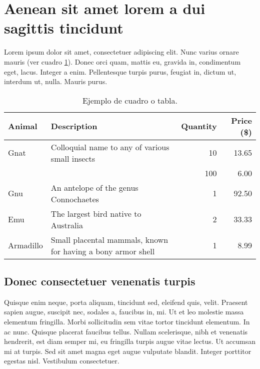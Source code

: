 %
%
\section[Aenean sit amet lorem a dui sagittis tincidunt]{
	Aenean sit amet lorem a dui sagittis tincidunt
}
\label{ejemplo_etiqueta_para_referenciar_seccion_020}

Lorem ipsum dolor sit amet, consectetuer adipiscing elit. Nunc varius ornare mauris (ver cuadro \ref{ejemplo_referencia_a_tabla_020}). Donec orci quam, mattis eu, gravida in, condimentum eget, lacus. Integer a enim. Pellentesque turpis purus, feugiat in, dictum ut, interdum ut, nulla. Mauris purus.


\vspace{0.5cm}
\begin{table}[h]
	\begin{center}
		\begin{tabular}{lp{6cm}rr}
			\toprule
				Animal & 
				Description &
				Quantity & 
				Price (\$) \\
			\midrule
			\midrule
				Gnat &	
				Colloquial name to any of various small insects &
				10 & 
				13.65 \\
		
				&
				&
				100 &
				6.00 \\
		
				Gnu &	
				An antelope of the genus Connochaetes &
				1 &
				92.50 \\
		
				Emu &
				The largest bird native to Australia &
				2 &
				33.33 \\
			
				Armadillo &
				Small placental mammals, known for having a bony armor shell &
				1 &
				8.99 \\
			\bottomrule
		\end{tabular}

	\end{center}

	\caption[Ejemplo de cuadro o tabla]{Ejemplo de cuadro o tabla.}
	\label{ejemplo_referencia_a_tabla_020}

\end{table}


\subsection*{Donec consectetuer venenatis turpis}
Quisque enim neque, porta aliquam, tincidunt sed, eleifend quis, velit. Praesent sapien augue, suscipit nec, sodales a, faucibus in, mi. Ut et leo molestie massa elementum fringilla. Morbi sollicitudin sem vitae tortor tincidunt elementum. In ac nunc. Quisque placerat faucibus tellus. Nullam scelerisque, nibh et venenatis hendrerit, est diam semper mi, eu fringilla turpis augue vitae lectus. Ut accumsan mi at turpis. Sed sit amet magna eget augue vulputate blandit. Integer porttitor egestas nisl. Vestibulum consectetuer.

